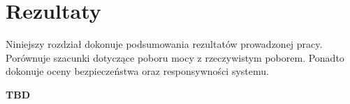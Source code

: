 \chapter{Rezultaty}
\label{chap:results}

Niniejszy rozdział dokonuje podsumowania rezultatów prowadzonej pracy. Porównuje szacunki dotyczące poboru mocy z rzeczywistym poborem. Ponadto dokonuje oceny bezpieczeństwa oraz responsywności systemu.

\textbf{TBD}